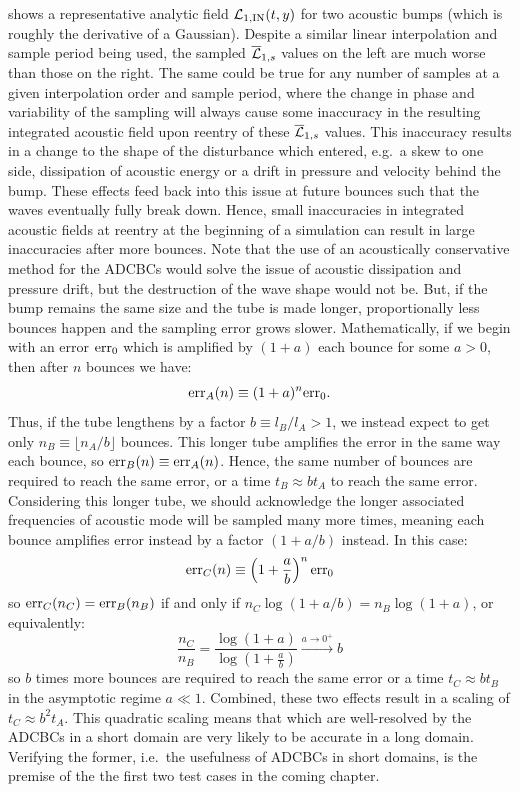  shows a representative analytic field $\cl{L}_{1, \rm{IN}}(t, y)$ for two acoustic bumps (which is roughly the derivative of a Gaussian). Despite a similar linear interpolation and sample period being used, the sampled $\overline{\cl{L}}_{1, s}$ values on the left are much worse than those on the right. The same could be true for any number of samples at a given interpolation order and sample period, where the change in phase and variability of the sampling will always cause some inaccuracy in the resulting integrated acoustic field upon reentry of these $\overline{\cl{L}}_{1, s}$ values. This inaccuracy results in a change to the shape of the disturbance which entered, e.g.\ a skew to one side, dissipation of acoustic energy or a drift in pressure and velocity behind the bump. These effects feed back into this issue at future bounces such that the waves eventually fully break down. Hence, small inaccuracies in integrated acoustic fields at reentry at the beginning of a simulation can result in large inaccuracies after more bounces. Note that the use of an acoustically conservative method for the ADCBCs would solve the issue of acoustic dissipation and pressure drift, but the destruction of the wave shape would not be. But, if the bump remains the same size and the tube is made longer, proportionally less bounces happen and the sampling error grows slower. Mathematically, if we begin with an error $\rm{err}_0$ which is amplified by $(1 + a)$ each bounce for some $a > 0$, then after $n$ bounces we have:
\begin{equation}
\rm{err}_A(n) \equiv (1 + a)^{n} \rm{err}_0.
\end{equation}
Thus, if the tube lengthens by a factor $b \equiv l_B / l_A > 1$, we instead expect to get only $n_B \equiv \lfloor n_A / b \rfloor$ bounces. This longer tube amplifies the error in the same way each bounce, so $\rm{err}_B(n) \equiv \rm{err}_A(n)$. Hence, the same number of bounces are required to reach the same error, or a time $t_B \approx b t_A$ to reach the same error. Considering this longer tube, we should acknowledge the longer associated frequencies of acoustic mode will be sampled many more times, meaning each bounce amplifies error instead by a factor $(1 + a / b)$ instead. In this case:
\begin{equation}
\rm{err}_C(n) \equiv \left( 1 + \frac{a}{b} \right)^n \rm{err}_0
\end{equation}
so $\rm{err}_C(n_C) = \rm{err}_B(n_B)$ if and only if $n_C \log(1 + a / b) = n_B \log(1 + a)$, or equivalently:
\begin{equation}
\frac{n_C}{n_B} = \frac{\log\left(1 + a\right)}{\log(1 + \frac{a}{b})} \xrightarrow{a \to 0^+} b
\end{equation}
so $b$ times more bounces are required to reach the same error or a time $t_C \approx b t_B$ in the asymptotic regime $a \ll 1$. Combined, these two effects result in a scaling of $t_C \approx b^2 t_A$. This quadratic scaling means that which are well-resolved by the ADCBCs in a short domain are very likely to be accurate in a long domain. Verifying the former, i.e.\ the usefulness of ADCBCs in short domains, is the premise of the the first two test cases in the coming chapter.



